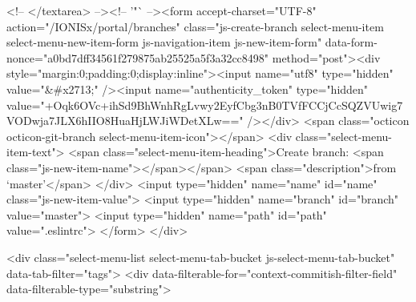           <!-- </textarea> --><!-- '"` --><form accept-charset="UTF-8" action="/IONISx/portal/branches" class="js-create-branch select-menu-item select-menu-new-item-form js-navigation-item js-new-item-form" data-form-nonce="a0bd7dff34561f279875ab25525a5f3a32cc8498" method="post"><div style="margin:0;padding:0;display:inline"><input name="utf8" type="hidden" value="&#x2713;" /><input name="authenticity_token" type="hidden" value="+Oqk6OVc+ihSd9BhWnhRgLvwy2EyfCbg3nB0TVfFCCjCcSQZVUwig7VODwja7JLX6hIIO8HuaHjLWJiWDetXLw==" /></div>
            <span class="octicon octicon-git-branch select-menu-item-icon"></span>
            <div class="select-menu-item-text">
              <span class="select-menu-item-heading">Create branch: <span class="js-new-item-name"></span></span>
              <span class="description">from ‘master’</span>
            </div>
            <input type="hidden" name="name" id="name" class="js-new-item-value">
            <input type="hidden" name="branch" id="branch" value="master">
            <input type="hidden" name="path" id="path" value=".eslintrc">
</form>
      </div>

      <div class="select-menu-list select-menu-tab-bucket js-select-menu-tab-bucket" data-tab-filter="tags">
        <div data-filterable-for="context-commitish-filter-field" data-filterable-type="substring">


